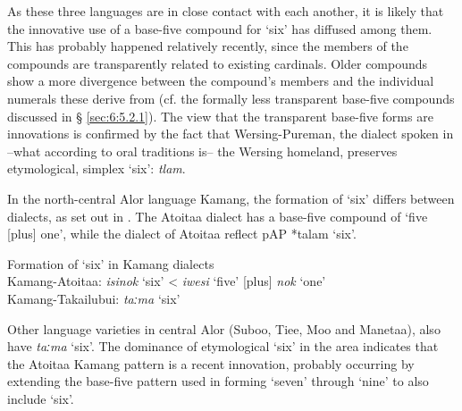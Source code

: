 

  

  

As these three languages are in close contact with each another, it is likely that the innovative  use of a base-five compound for `six' has diffused among them. This has probably happened relatively recently, since the members of the compounds are transparently related to existing cardinals. Older compounds show a more divergence between the compound's members and the individual numerals these derive from (cf. the formally less transparent base-five compounds discussed in {\S} \ref{sec:6:5.2.1}). The view that the transparent base-five forms are innovations is confirmed by the fact that Wersing-Pureman, the dialect spoken in --what according to oral traditions is-- the Wersing homeland, preserves etymological, simplex `six': \textit{t{\textschwa}lam}.

In the north-central Alor language Kamang, the formation of `six' differs between dialects, as set out in . The Atoitaa dialect has a base-five compound of `five [plus] one', while the dialect of Atoitaa reflect p\textsc{AP} *talam `six'. 



\ea%
\label{ex:6:5}
 \upshape Formation of `six' in Kamang dialects\\
 Kamang{}-Atoitaa: 
\textit{isi}\textit{{\ng}}\textit{nok}\textbf{} `six'     {\textless} \textit{iwesi}\textit{{\ng}} `five' [plus] \textit{nok} `one'\\
    Kamang{}-Takailubui:
    \textit{taːma} `six'      \\ 
\z





Other language varieties in central Alor (Suboo, Tiee, Moo and Manetaa), also have \textit{taːma} `six'. The dominance of etymological `six' in the area indicates that the Atoitaa Kamang pattern is a recent innovation, probably occurring by extending the base-five pattern used in forming `seven' through `nine' to also include `six'. 

